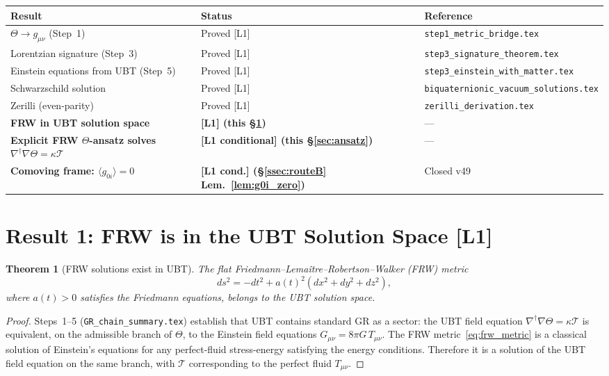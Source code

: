 \documentclass[12pt,a4paper]{article}
\newtheorem{theorem}{Theorem}[section]
\theoremstyle{definition}
\theoremstyle{remark}
\begin{document}
\begin{center}
\begin{tabular}{lll}
  \toprule
  \textbf{Result} & \textbf{Status} & \textbf{Reference} \\
  \midrule
  $\Theta \to g_{\mu\nu}$ (Step~1) & Proved [L1] &
    \texttt{step1\_metric\_bridge.tex} \\
  Lorentzian signature (Step~3) & Proved [L1] &
    \texttt{step3\_signature\_theorem.tex} \\
  Einstein equations from UBT (Step~5) & Proved [L1] &
    \texttt{step3\_einstein\_with\_matter.tex} \\
  Schwarzschild solution & Proved [L1] &
    \texttt{biquaternionic\_vacuum\_solutions.tex} \\
  Zerilli (even-parity) & Proved [L1] &
    \texttt{zerilli\_derivation.tex} \\
  \textbf{FRW in UBT solution space} & \textbf{[L1] (this §\ref{sec:frw_in_ubt})} & --- \\
  \textbf{Explicit FRW $\Theta$-ansatz solves $\nabla^\dagger\nabla\Theta=\kappa\mathcal{T}$} & \textbf{[L1 conditional] (this §\ref{sec:ansatz})} & --- \\
  \textbf{Comoving frame: $\langle g_{0i}\rangle=0$} & \textbf{[L1 cond.] (§\ref{ssec:routeB} Lem.~\ref{lem:g0i_zero})} & Closed v49 \\
  \bottomrule
\end{tabular}
\end{center}

\section{Result 1: FRW is in the UBT Solution Space [L1]}
\label{sec:frw_in_ubt}

\begin{theorem}[FRW solutions exist in UBT]
\label{thm:frw_exists}
The flat Friedmann--Lemaître--Robertson--Walker (FRW) metric
\begin{equation}
  \label{eq:frw_metric}
  ds^2 = -dt^2 + a(t)^2\!\left(dx^2+dy^2+dz^2\right),
\end{equation}
where $a(t)>0$ satisfies the Friedmann equations, belongs to the UBT solution space.
\end{theorem}

\begin{proof}
Steps~1--5 (\texttt{GR\_chain\_summary.tex}) establish that UBT contains standard GR
as a sector: the UBT field equation $\nabla^\dagger\nabla\Theta = \kappa\mathcal{T}$
is equivalent, on the admissible branch of $\Theta$, to the Einstein field equations
$G_{\mu\nu} = 8\pi G\, T_{\mu\nu}$.
The FRW metric~\eqref{eq:frw_metric} is a classical solution of Einstein's equations
for any perfect-fluid stress-energy satisfying the energy conditions.
Therefore it is a solution of the UBT field equation on the same branch, with
$\mathcal{T}$ corresponding to the perfect fluid $T_{\mu\nu}$.
\end{proof}
\end{document}
